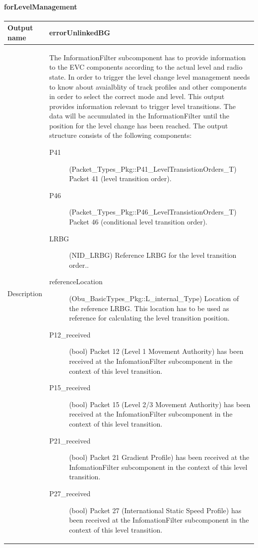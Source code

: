 \paragraph{forLevelManagement}

\begin{longtable}{p{}p{}}
\toprule
Output name				& errorUnlinkedBG \\
\midrule
Description				& The InformationFilter subcomponent has to provide information to the EVC components according to the actual level and radio state. In order to trigger the level change level management needs to know about avaialblity of track profiles and other components in order to select the correct mode and level. This output provides information relevant to trigger level transitions. The data will be accumulated in the InformationFilter until the position for the level change has been reached. The output structure consists of the following components:
\begin{description}
\item[P41](Packet\_Types\_Pkg::P41\_LevelTransistionOrders\_T) Packet 41 (level transition order). 
\item[P46](Packet\_Types\_Pkg::P46\_LevelTransistionOrders\_T) Packet 46 (conditional level transition order). 
\item[LRBG](NID\_LRBG) Reference LRBG for the level transition order..
\item[referenceLocation](Obu\_BasicTypes\_Pkg::L\_internal\_Type) Location of the reference LRBG. This location has to be used as reference for calculating the level transition position. 
\item[P12\_received](bool) Packet 12 (Level 1 Movement Authority) has been received at the InfomationFilter subcomponent in the context of this level transition. 
\item[P15\_received](bool) Packet 15 (Level 2/3 Movement Authority) has been received at the InfomationFilter subcomponent in the context of this level transition. 
\item[P21\_received](bool) Packet 21 Gradient Profile) has been received at the InfomationFilter subcomponent in the context of this level transition. 
\item[P27\_received](bool) Packet 27 (International Static Speed Profile) has been received at the InfomationFilter subcomponent in the context of this level transition. 
\end{description}


\end{longtable}
